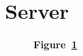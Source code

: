 \section{Server}\label{sec:server}

\begin{landscape}
	\begin{figure}[!h]
		\caption*{\textbf{Figure~\ref{fig:server}}}
		\captionlistentry{}\label{fig:server}
	\end{figure}
\end{landscape}
